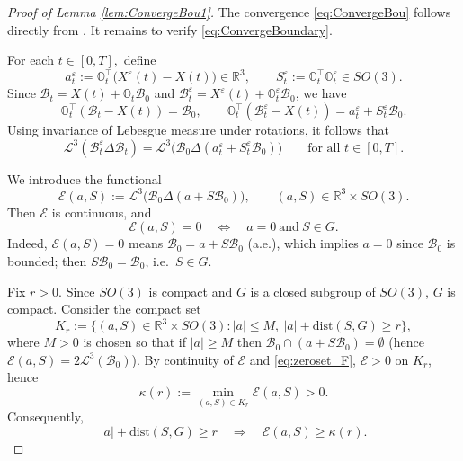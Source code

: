 \documentclass[11pt,twoside,reqno]{amsart}
\numberwithin{equation}{section}
\numberwithin{figure}{section}
\begin{document}
\begin{proof}[Proof of Lemma \ref{lem:ConvergeBou1}] 

The convergence \eqref{eq:ConvergeBou} follows directly from \cite[Lemma 5.4]{gerard2014existence}. It remains to verify \eqref{eq:ConvergeBoundary}.

For each $t\in[0,T],$ define
\[
a_t^\varepsilon := \mathbb{O}_t^\top\big(X^\varepsilon(t)-X(t)\big)\in\mathbb{R}^3,
\qquad
S_t^\varepsilon := \mathbb{O}_t^\top \mathbb{O}_t^\varepsilon \in SO(3).
\]
Since $\mathcal{B}_t=X(t)+\mathbb{O}_t\mathcal{B}_0$ and
$\mathcal{B}_t^\varepsilon=X^\varepsilon(t)+\mathbb{O}_t^\varepsilon\mathcal{B}_0$, we have
\[
\mathbb{O}_t^\top(\mathcal{B}_t-X(t))=\mathcal{B}_0,
\qquad
\mathbb{O}_t^\top(\mathcal{B}_t^\varepsilon-X(t))
=a_t^\varepsilon + S_t^\varepsilon \mathcal{B}_0.
\]
Using invariance of Lebesgue measure under rotations, it follows that
\begin{equation}\label{eq:pullback_sd}
\mathcal{L}^3(\mathcal{B}_t^\varepsilon\Delta\mathcal{B}_t)
=
\mathcal{L}^3\big(\mathcal{B}_0 \Delta (a_t^\varepsilon + S_t^\varepsilon\mathcal{B}_0)\big)
\qquad \text{for all } t\in[0,T].
\end{equation}

We introduce the functional
\[
\mathcal{E}(a,S)
:=\mathcal{L}^3\big(\mathcal{B}_0 \Delta (a+S\mathcal{B}_0)\big),
\qquad (a,S)\in\mathbb{R}^3\times SO(3).
\]
Then $\mathcal{E}$ is continuous, and
\begin{equation}\label{eq:zeroset_F}
\mathcal{E}(a,S)=0
\quad\Longleftrightarrow\quad
a=0 \ \text{and}\ S\in G.
\end{equation}
Indeed, $\mathcal{E}(a,S)=0$ means $\mathcal{B}_0=a+S\mathcal{B}_0$ (a.e.), which implies $a=0$
since $\mathcal{B}_0$ is bounded; then $S\mathcal{B}_0=\mathcal{B}_0$, i.e.\ $S\in G$.

Fix $r>0$. Since $SO(3)$ is compact and $G$ is a closed subgroup of $SO(3)$, $G$ is compact.
Consider the compact set
\[
K_r:=\big\{(a,S)\in\mathbb{R}^3\times SO(3): |a|\le M,\ |a|+\mathrm{dist}(S,G)\ge r\big\},
\]
where $M>0$ is chosen so that if $|a|\ge M$ then
$\mathcal{B}_0\cap(a+S\mathcal{B}_0)=\emptyset$ (hence $\mathcal{E}(a,S)=2\mathcal{L}^3(\mathcal{B}_0)$).
By continuity of $\mathcal{E}$ and \eqref{eq:zeroset_F}, $\mathcal{E}>0$ on $K_r$, hence
\[
\kappa(r):=\min_{(a,S)\in K_r}\mathcal{E}(a,S)>0.
\]
Consequently,
\begin{equation}\label{eq:coercive_F}
|a|+\mathrm{dist}(S,G)\ge r
\quad\Longrightarrow\quad
\mathcal{E}(a,S)\ge \kappa(r).
\end{equation}



\end{proof}
\end{document}
